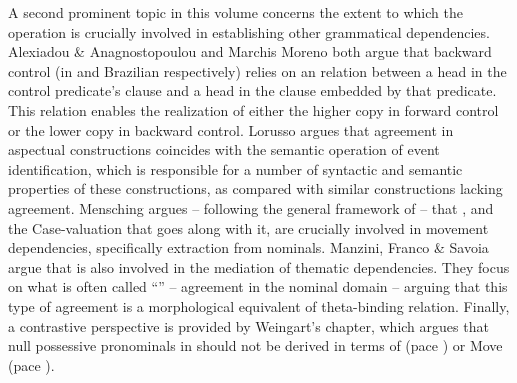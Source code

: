 \documentclass[output=paper]{langsci/langscibook}
\begin{document}
A second prominent topic in this volume concerns the extent to which the operation  is crucially involved in establishing other grammatical dependencies. Alexiadou \& Anagnostopoulou and Marchis Moreno both argue that backward control (in  and Brazilian  respectively) relies on an  relation between a head in the control predicate’s clause and a head in the clause embedded by that predicate. This relation enables the realization of either the higher copy in forward control or the lower copy in backward control. Lorusso argues that agreement in aspectual constructions coincides with the semantic operation of event identification, which is responsible for a number of syntactic and semantic properties of these constructions, as compared with similar constructions lacking agreement. Mensching argues – following the general framework of \citet{Chomsky2000,Chomsky2001Derivation} – that , and the Case-valuation that goes along with it, are crucially involved in movement dependencies, specifically extraction from nominals. Manzini, Franco \& Savoia argue that  is also involved in the mediation of thematic dependencies. They focus on what is often called ``'' – agreement in the nominal domain – arguing that this type of agreement is a morphological equivalent of  theta-binding relation. Finally, a contrastive perspective is provided by Weingart’s chapter, which argues that null possessive pronominals in  should not be derived in terms of  (pace \citealt{Hicks2009}) or Move (pace \citealt{Floripi2009,Rodrigues2010}).
\end{document}
